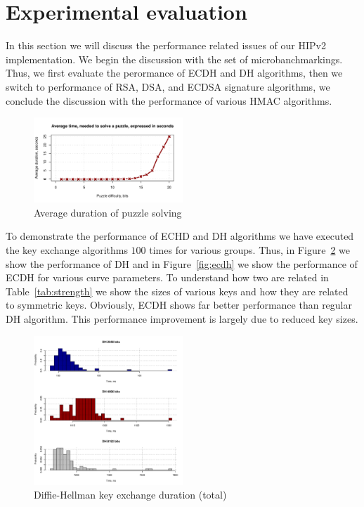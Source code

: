 \section{Experimental evaluation}
\label{section:experiments}

In this section we will discuss the performance related issues of our 
HIPv2 implementation. We begin the discussion with the set of 
microbanchmarkings. Thus, we first evaluate the perormance of ECDH and DH
algorithms, then we switch to performance of RSA, DSA, and ECDSA signature
algorithms, we conclude the discussion with the performance of various HMAC 
algorithms.

\begin{figure}
	\includegraphics[width=0.5\textwidth]{graphics/puzzle_solution_perf.pdf}
	\caption{Average duration of puzzle solving}
	\label{fig:puzzle}
\end{figure}

To demonstrate the performance of ECHD and DH algorithms we have 
executed the key exchange algorithms $100$ times for various 
groups. Thus, in Figure~\ref{fig:dh} we show the performance of
DH and in Figure~\ref{fig:ecdh} we show the performance 
of ECDH for various curve parameters. To understand how two
are related in Table~\ref{tab:strength} we show the sizes
of various keys and how they are related to symmetric keys.
Obviously, ECDH shows far better performance than regular
DH algorithm. This performance improvement is largely due
to reduced key sizes.

\begin{figure}
	\includegraphics[width=0.5\textwidth]{graphics/dh_computation_hist.pdf}
	\caption{Diffie-Hellman key exchange duration (total)}
	\label{fig:dh}
\end{figure}

